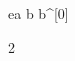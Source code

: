 \begin{eqcode}{e}{a }{}{}
  b \in {} \lend
  b^{[0]} \gets \begin{tmatrix} 2  \lend \end{tmatrix} \lend
   \lend
\end{eqcode}
